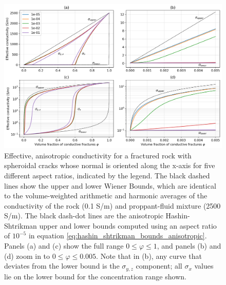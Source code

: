 \begin{figure}
    \begin{center}
    \includegraphics[width=\columnwidth]{figures/phys_prop_model/aligned_fractures.png}
    \end{center}
\caption{
    Effective, anisotropic conductivity for a fractured rock with spheroidal
    cracks whose normal is oriented along the x-axis for five different aspect ratios, indicated by the legend.
    The black dashed lines show the upper and lower
    Wiener Bounds, which are identical to the volume-weighted arithmetic and harmonic averages of the
    conductivity of the rock (0.1 S/m) and proppant-fluid mixture (2500 S/m). The black dash-dot lines
    are the anisotropic Hashin-Shtrikman upper and lower bounds computed using an aspect ratio of $10^{-5}$ in
    equation \ref{eq:hashin_shtrikman_bounds_anisotropic}.
    Panels (a) and (c) show the
    full range $0 \leq \varphi \leq 1$, and panels (b) and (d) zoom in to $0 \leq \varphi \leq 0.005$.
    Note that in (b), any curve that deviates from the lower bound is the $\sigma_{y, z}$ component;
    all $\sigma_x$ values lie on the lower bound for the concentration range shown.
}
\label{fig:aligned_fractures}
\end{figure}

